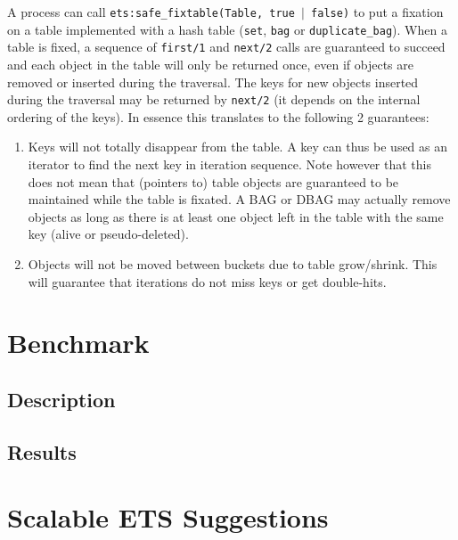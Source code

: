 \documentclass[aps,pre,preprint,nofootinbib]{revtex4}
\begin{document}
A process can call \texttt{ets:safe\_fixtable(Table, true $|$ false)} to put a fixation on a table implemented with a hash table (\verb|set|, \verb|bag| or \verb|duplicate_bag|). When a table is fixed, a sequence of \verb|first/1| and \verb|next/2| calls are guaranteed to succeed and each object in the table will only be returned once, even if objects are removed or inserted during the traversal. The keys for new objects inserted during the traversal may be returned by \verb|next/2| (it depends on the internal ordering of the keys). In essence this translates to the following 2 guarantees:

\begin{enumerate}
  \item Keys will not totally disappear from the table. A key can thus be used as an iterator to find the next key in iteration sequence. Note however that this does not mean that (pointers to) table objects are guaranteed to be maintained while the table is fixated. A BAG or DBAG may actually remove objects as long as there is at least one object left in the table with the same key (alive or pseudo-deleted).
    \item Objects will not be moved between buckets due to table grow/shrink. This will guarantee that iterations do not miss keys or get double-hits.
\end{enumerate}

\section{Benchmark} \label{sec:benchmark}

\subsection{Description}

\subsection{Results}


\section{Scalable ETS Suggestions}

\begin{thebibliography}{9}
\end{thebibliography}
\end{document}
